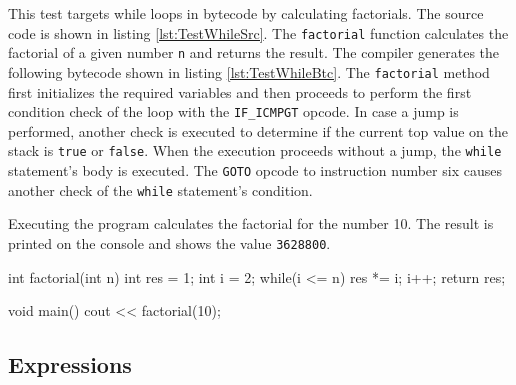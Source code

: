 This test targets while loops in bytecode by calculating factorials. The source code is shown in listing \ref{lst:TestWhileSrc}. The \verb|factorial| function calculates the factorial of a given number \verb|n| and returns the result. The compiler generates the following bytecode shown in listing \ref{lst:TestWhileBtc}. The \verb|factorial| method first initializes the required variables and then proceeds to perform the first condition check of the loop with the \verb|IF_ICMPGT| opcode. In case a jump is performed, another check is executed to determine if the current top value on the stack is \verb|true| or \verb|false|. When the execution proceeds without a jump, the \verb|while| statement's body is executed. The \verb|GOTO| opcode to instruction number six causes another check of the \verb|while| statement's condition. 


Executing the program calculates the factorial for the number 10. The result is printed on the console and shows the value \verb|3628800|. 

\begin{CppCode}[float,numbers=none,caption=MiniC\texttt{++} source code to calculate factorial with a \texttt{while} loop., label=lst:TestWhileSrc]
  int factorial(int n)
  {
    int res = 1;
    int i = 2;
    while(i <= n)
    {
       res *= i;
       i++;
    }       
      return res;
  }
  
  void main() {
    cout << factorial(10);
  }
  \end{CppCode}

    



\subsection{Expressions}